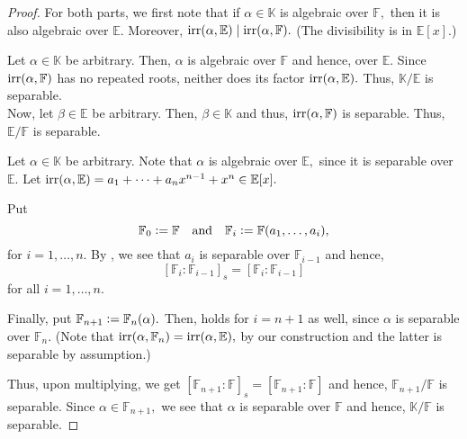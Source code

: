 \compdecompsep*\label{prop:compdecompsep2}
\begin{flushright}\hyperref[prop:compdecompsep]{\upsym}\end{flushright}
\begin{proof}
    For both parts, we first note that if $\alpha \in \mathbb{K}$ is algebraic over $\mathbb{F},$ then it is also algebraic over $\mathbb{E}.$ Moreover, $\operatorname{irr}(\alpha, \mathbb{E}) \mid \operatorname{irr}(\alpha, \mathbb{F}).$ (The divisibility is in $\mathbb{E}[x].$)

    \forward Let $\alpha \in \mathbb{K}$ be arbitrary. Then, $\alpha$ is algebraic over $\mathbb{F}$ and hence, over $\mathbb{E}.$ Since $\operatorname{irr}(\alpha, \mathbb{F})$ has no repeated roots, neither does its factor $\operatorname{irr}(\alpha, \mathbb{E}).$ Thus, $\mathbb{K}/\mathbb{E}$ is separable. \\
    Now, let $\beta \in \mathbb{E}$ be arbitrary. Then, $\beta \in \mathbb{K}$ and thus, $\operatorname{irr}(\alpha, \mathbb{F})$ is separable. Thus, $\mathbb{E}/\mathbb{F}$ is separable.

    \backward Let $\alpha \in \mathbb{K}$ be arbitrary. Note that $\alpha$ is algebraic over $\mathbb{E},$ since it is separable over $\mathbb{E}.$ Let $\operatorname{irr}(\alpha, \mathbb{E}) = a_1 + \cdots + a_{n }x^{n - 1} + x^n \in \mathbb{E}[x].$ 

    Put 
    \begin{equation*} 
        \mathbb{F}_0 \vcentcolon= \mathbb{F} \quad\text{and}\quad \mathbb{F}_i \vcentcolon= \mathbb{F}(a_1, \ldots, a_i),
    \end{equation*} 
    for $i = 1, \ldots, n.$ By \forward, we see that $a_i$ is separable over $\mathbb{F}_{i - 1}$ and hence, 
    \begin{equation} \label{eq:002} \tag{$*$}
        [\mathbb{F}_i : \mathbb{F}_{i - 1}]_s = [\mathbb{F}_i : \mathbb{F}_{i - 1}]
    \end{equation} 
    for all $i = 1, \ldots, n.$

    Finally, put $\mathbb{F}_{n + 1} \vcentcolon= \mathbb{F}_n(\alpha).$ Then,  holds for $i = n + 1$ as well, since $\alpha$ is separable over $\mathbb{F}_n.$ (Note that $\operatorname{irr}(\alpha, \mathbb{F}_n) = \operatorname{irr}(\alpha, \mathbb{E}),$ by our construction and the latter is separable by assumption.)

    Thus, upon multiplying, we get $[\mathbb{F}_{n + 1} : \mathbb{F}]_s = [\mathbb{F}_{n + 1} : \mathbb{F}]$ and hence, $\mathbb{F}_{n + 1}/\mathbb{F}$ is separable. Since $\alpha \in \mathbb{F}_{n + 1},$ we see that $\alpha$ is separable over $\mathbb{F}$ and hence, $\mathbb{K}/\mathbb{F}$ is separable.
\end{proof}

